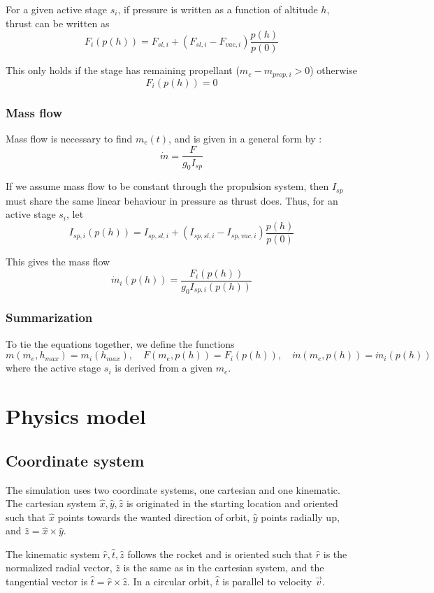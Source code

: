 \documentclass[11pt]{article}
\begin{document}
For a given active stage $s_i$, if pressure is written as a function of altitude $h$, thrust can be written as 
$$
F_i(p(h)) = F_{sl,i} + \left( F_{sl,i} - F_{vac,i} \right) \frac{p(h)}{p(0)}
$$

This only holds if the stage has remaining propellant ($m_e - m_{prop,i} > 0$) 
otherwise 
$$
F_i(p(h)) = 0
$$

\subsubsection{Mass flow}
% 
%
Mass flow is necessary to find $m_e(t)$, and is given in a general form by \cite{massflow}:
$$
\dot{m} = \frac{F}{ g_0 I_{sp}}
$$

If we assume mass flow to be constant through the propulsion system, then $I_{sp}$ must share the same linear behaviour in pressure as thrust does.
Thus, for an active stage $s_i$, let
$$
I_{sp,i}(p(h)) = I_{sp,sl,i} + \left( I_{sp,sl,i} - I_{sp,vac,i} \right) \frac{p(h)}{p(0)}
$$

This gives the mass flow
$$
\dot{m}_i(p(h)) = \frac{F_i(p(h))}{ g_0 I_{sp,i}(p(h))}
$$

\subsubsection{Summarization}
To tie the equations together, we define the functions
$$
m(m_e, h_{max}) = m_i(h_{max}), \quad 
F(m_e, p(h)) = F_i(p(h)), \quad 
\dot{m}(m_e, p(h)) = \dot{m}_i(p(h)) \quad 
$$
where the active stage $s_i$ is derived from a given $m_e$.

\section{Physics model}

\subsection{Coordinate system}
The simulation uses two coordinate systems, one cartesian and one kinematic.
The cartesian system $\hat{x}, \hat{y}, \hat{z}$ is originated in the starting location and oriented such that
$\hat{x}$ points towards the wanted direction of orbit,
$\hat{y}$ points radially up, and $\hat{z} = \hat{x} \times \hat{y}$.

The kinematic system $\hat{r}, \hat{t}, \hat{z}$ follows the rocket and is oriented such that 
$\hat{r}$ is the normalized radial vector, $\hat{z}$ is the same as in the cartesian system, 
and the tangential vector is $\hat{t} = \hat{r} \times \hat{z}$. In a circular orbit, $\hat{t}$ is parallel to velocity $\vec{v}$.
\end{document}
